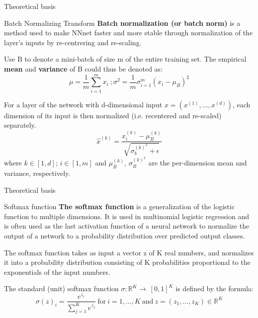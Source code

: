 \begin{frame}{Theoretical basis}
  \begin{block}{Batch Normalizing Transform}
  \textbf{Batch normalization (or batch norm)} is a method used to make NNnet faster and more stable through normalization of the layer's inputs by re-centrering and re-scaling.

  Use B to denote a mini-batch of size m of the entire training set. The empirical \textbf{mean} and \textbf{variance} of B could thus be denoted as:
  \begin{equation}
    \mu = \frac{1}{m}\sum_{i=1}^{m}{x_i}\ ; \sigma^2 = \frac{1}{m}\sigma_{i=1}^{m}{(x_i-\mu_B)^2}
  \end{equation}

  For a layer of the network with d-dimensional input \(x = (x^{(1)},..., x^{(d)})\), each dimension of its input is then normalized (i.e. recentered and re-scaled) separately.
  \begin{equation}
    \hat{x}^{(k)} = \frac{x_i^{(k)} - \mu_B^{(k)}}{\sqrt{\sigma_b^{(k)^2} + \epsilon}}
  \end{equation}
  where \(k \in [1,d]\); \(i \in [1,m]\) and \(\mu_B^{(k)}\), \(\sigma_B^{(k)^2}\) are the per-dimension mean and variance, respectively.
  \end{block}
\end{frame}

\begin{frame}{Theoretical basis}
  \begin{block}{Softmax function}
    \textbf{The softmax function} is a generalization of the logistic function to multiple dimensions. It is used in multinomial logistic regression and is often used as the last activation function of a neural network to normalize the output of a network to a probability distribution over predicted output classes.

    The softmax function takes as input a vector z of K real numbers, and normalizes it into a probability distribution consisting of K probabilities proportional to the exponentials of the input numbers.

    The standard (unit) softmax function \(\sigma:\mathbb{R}^K \rightarrow\ [0,1]^K\) is defined by the formula:
    \begin{equation}
      \sigma(z)_i = \frac{e^{z_i}}{\sum_{j=1}^K{e^{z_j}}}\ \text{for}\ i=1,...,K \ \text{and}\ z = (z_1,...,z_K) \in \mathbb{R}^K
    \end{equation}
  \end{block}
\end{frame}
